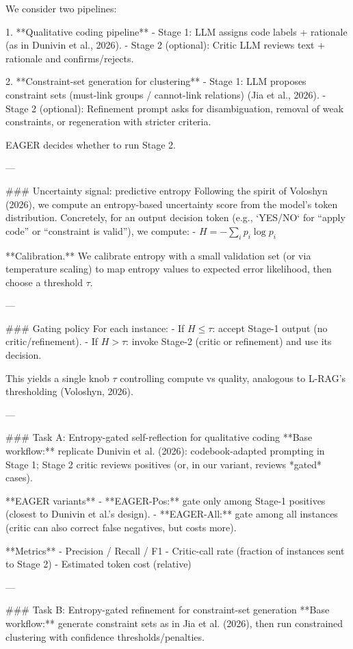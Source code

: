 We consider two pipelines:

1. **Qualitative coding pipeline**
   - Stage 1: LLM assigns code labels + rationale (as in Dunivin et al., 2026).
   - Stage 2 (optional): Critic LLM reviews text + rationale and confirms/rejects.

2. **Constraint-set generation for clustering**
   - Stage 1: LLM proposes constraint sets (must-link groups / cannot-link relations) (Jia et al., 2026).
   - Stage 2 (optional): Refinement prompt asks for disambiguation, removal of weak constraints, or regeneration with stricter criteria.

EAGER decides whether to run Stage 2.

---

### Uncertainty signal: predictive entropy
Following the spirit of Voloshyn (2026), we compute an entropy-based uncertainty score from the model’s token distribution. Concretely, for an output decision token (e.g., `YES/NO` for “apply code” or “constraint is valid”), we compute:
- \( H = -\sum_{i} p_i \log p_i \)

**Calibration.** We calibrate entropy with a small validation set (or via temperature scaling) to map entropy values to expected error likelihood, then choose a threshold \( \tau \).

---

### Gating policy
For each instance:
- If \( H \le \tau \): accept Stage-1 output (no critic/refinement).
- If \( H > \tau \): invoke Stage-2 (critic or refinement) and use its decision.

This yields a single knob \( \tau \) controlling compute vs quality, analogous to L-RAG’s thresholding (Voloshyn, 2026).

---

### Task A: Entropy-gated self-reflection for qualitative coding
**Base workflow:** replicate Dunivin et al. (2026): codebook-adapted prompting in Stage 1; Stage 2 critic reviews positives (or, in our variant, reviews *gated* cases).

**EAGER variants**
- **EAGER-Pos:** gate only among Stage-1 positives (closest to Dunivin et al.’s design).
- **EAGER-All:** gate among all instances (critic can also correct false negatives, but costs more).

**Metrics**
- Precision / Recall / F1
- Critic-call rate (fraction of instances sent to Stage 2)
- Estimated token cost (relative)

---

### Task B: Entropy-gated refinement for constraint-set generation
**Base workflow:** generate constraint sets as in Jia et al. (2026), then run constrained clustering with confidence thresholds/penalties.

